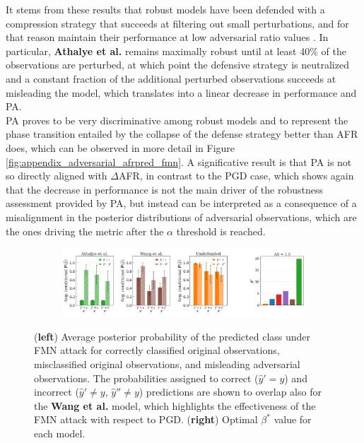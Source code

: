 It stems from these results that robust models have been defended with a
compression strategy that succeeds at filtering out small perturbations, and for that 
reason maintain their performance at low adversarial ratio values \cite{dasKeepingBadGuys2017}.
In particular, {\color{tab:green} \textbf{Athalye et al.}} remains maximally robust
until at least 40\% of the observations are perturbed, at which point the defensive strategy
is neutralized and a constant fraction of the additional perturbed observations succeeds at
misleading the model, which translates into a linear decrease in performance and PA. \\

PA proves to be very discriminative among robust models and to represent the 
phase transition entailed by the collapse of the defense strategy better than AFR does, which can be
observed in more detail in Figure \ref{fig:appendix_adversarial_afrpred_fmn}. A significative
result is that PA is not so directly aligned with $\Delta$AFR, in contrast to
the PGD case, which shows again that the decrease in performance is not the main driver of
the robustness assessment provided by PA, but instead can be interpreted as a consequence of
a misalignment in the posterior distributions of adversarial observations, which are the ones driving
the metric after the $\alpha$ threshold is reached. \\

\begin{figure}[H]
    \centering
    \begin{subfigure}[b]{\textwidth}
        \centering
        \includegraphics[width=\textwidth]{img/results_discussion/adversarial/bpda_wang_undefended_beta_fmn.png}
    \end{subfigure}
   
    \caption{(\textbf{left}) Average posterior probability of the predicted class under
    FMN attack for correctly classified original observations, misclassified original observations, and 
    misleading adversarial observations. The probabilities assigned to correct 
    ($\hat{y}' = y$) and incorrect ($\hat{y}' \neq y$, $\hat{y}'' \neq y$)
    predictions are shown to overlap also for the {\color{tab:brown} \textbf{Wang et al.}}
    model, which highlights the effectiveness of the FMN attack with respect to PGD.
    (\textbf{right}) Optimal $\beta^{*}$ value for each model.
    }
    \label{fig:unrobust_posterior_short_fmn}
\end{figure}

